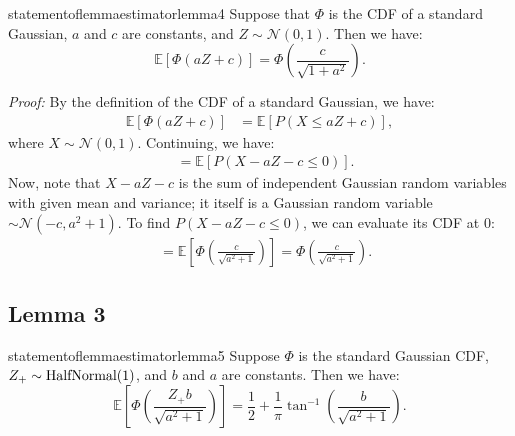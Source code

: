 \documentclass{article} %
\begin{document}
\begin{restatable}{statementoflemma}{estimatorlemma4}
\label{estimatorlemma4}
Suppose that $\Phi$ is the CDF of a standard Gaussian, $a$ and $c$ are constants, and $Z \sim \mathcal{N}(0, 1)$. Then we have:
\[
\mathbb{E}[\Phi(aZ + c)] = \Phi\left(\frac{c}{\sqrt{1+a^2}}\right).
\]
\end{restatable}

\textit{Proof:}
By the definition of the CDF of a standard Gaussian, we have:
\begin{align*}
\mathbb{E}[\Phi(aZ + c)] &= \mathbb{E}[P(X \leq aZ + c)],
\end{align*}
where $X \sim \mathcal{N}(0, 1)$. Continuing, we have:
\begin{align*}
&= \mathbb{E}[P(X - aZ - c \leq 0 )].
\end{align*}
Now, note that $X - aZ - c$ is the sum of independent Gaussian random variables with given mean and variance; it itself is a Gaussian random variable $\sim \mathcal{N}(-c, a^2 + 1)$. To find $P(X - aZ - c \leq 0 )$, we can evaluate its CDF at $0$:
\begin{align*}
&= \mathbb{E}\left[\Phi\left(\frac{c}{\sqrt{a^2+1}}\right)\right] = \Phi\left(\frac{c}{\sqrt{a^2+1}}\right).
\end{align*}

\subsection{Lemma 3}

\begin{restatable}{statementoflemma}{estimatorlemma5}
\label{estimatorlemma5}
Suppose $\Phi$ is the standard Gaussian CDF, $Z_+ \sim \textnormal{HalfNormal}(1)$, and $b$ and $a$ are constants. Then we have:
\[
\mathbb{E}\left[\Phi\left(\frac{Z_{+}b}{\sqrt{a^2+1}}\right)\right] = \frac{1}{2} + \frac{1}{\pi}\tan^{-1}\left(\frac{b}{\sqrt{a^2+1}}\right).
\]
\end{restatable}
\end{document}
